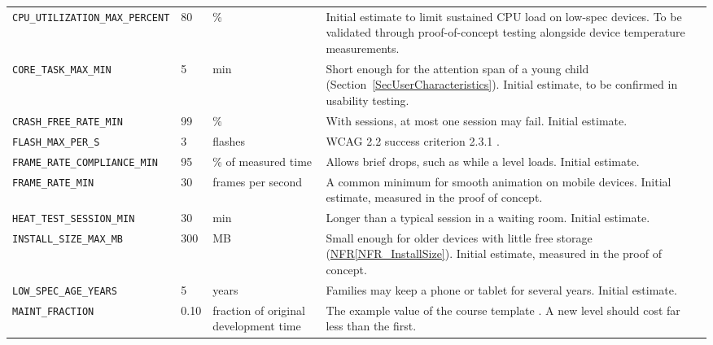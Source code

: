 \documentclass[10pt]{article}
\newcommand{\nfrref}[1]{\hyperref[#1]{NFR\ref*{#1}}}
\newcommand{\constref}[1]{%
    \hyperref[const:#1]{\texttt{\detokenize{#1}}}%
}
\begin{document}
\begin{longtable}{>{\raggedright\arraybackslash}p{} p{} >{\raggedright\arraybackslash}p{} >{\raggedright\arraybackslash}p{}}
\texttt{CPU\_UTILIZATION\_MAX\_PERCENT}
\label{const:CPU_UTILIZATION_MAX_PERCENT}
& 80 & \% & Initial estimate to limit sustained CPU load on low-spec devices. To be validated through proof-of-concept testing alongside device temperature measurements. \\

\texttt{CORE\_TASK\_MAX\_MIN}
\label{const:CORE_TASK_MAX_MIN}
& 5 & min & Short enough for the attention span of a young child (Section~\ref{SecUserCharacteristics}). Initial estimate, to be confirmed in usability testing. \\

\texttt{CRASH\_FREE\_RATE\_MIN}
\label{const:CRASH_FREE_RATE_MIN}
& 99 & \% & With \constref{TEST_SESSIONS_MIN} sessions, at most one session may fail. Initial estimate. \\

\texttt{FLASH\_MAX\_PER\_S}
\label{const:FLASH_MAX_PER_S}
& 3 & flashes & WCAG 2.2 success criterion 2.3.1 \cite{WCAG22}. \\

\texttt{FRAME\_RATE\_COMPLIANCE\_MIN}
\label{const:FRAME_RATE_COMPLIANCE_MIN}
& 95 & \% of measured time & Allows brief drops, such as while a level loads. Initial estimate. \\

\texttt{FRAME\_RATE\_MIN}
\label{const:FRAME_RATE_MIN}
& 30 & frames per second & A common minimum for smooth animation on mobile devices. Initial estimate, measured in the proof of concept. \\

\texttt{HEAT\_TEST\_SESSION\_MIN}
\label{const:HEAT_TEST_SESSION_MIN}
& 30 & min & Longer than a typical session in a waiting room. Initial estimate. \\

\texttt{INSTALL\_SIZE\_MAX\_MB}
\label{const:INSTALL_SIZE_MAX_MB}
& 300 & MB & Small enough for older devices with little free storage (\nfrref{NFR_InstallSize}). Initial estimate, measured in the proof of concept. \\

\texttt{LOW\_SPEC\_AGE\_YEARS}
\label{const:LOW_SPEC_AGE_YEARS}
& 5 & years & Families may keep a phone or tablet for several years. Initial estimate. \\

\texttt{MAINT\_FRACTION}
\label{const:MAINT_FRACTION}
& 0.10 & fraction of original development time & The example value of the course template \cite{SmithCapTemplate}. A new level should cost far less than the first. \\


\end{longtable}
\end{document}
